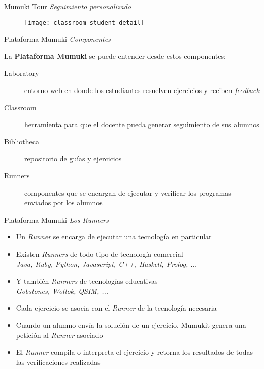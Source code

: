 \documentclass{beamer}
\begin{document}
\begin{frame}
    {Mumuki Tour}
    {\emph{Seguimiento personalizado}}

    \begin{figure}[h]
        \texttt{[image: classroom-student-detail]}
    \end{figure}
\end{frame}

\begin{frame}
    {Plataforma Mumuki}
    {\emph{Componentes}}

    La \textbf{Plataforma Mumuki} se puede entender desde estos componentes:

    \vspace{1.5em}

    \begin{description}
        \item[Laboratory] entorno web en donde los estudiantes resuelven ejercicios
        y reciben \emph{feedback}
        \item[Classroom] herramienta para que el docente pueda generar seguimiento de sus alumnos
        \item[Bibliotheca] repositorio de guías y ejercicios
        \item[Runners] componentes que se encargan de ejecutar y verificar los programas enviados por los alumnos
    \end{description}


\end{frame}


\begin{frame}
    {Plataforma Mumuki}
    {\emph{Los Runners}}

    \begin{itemize}
        \item Un \emph{Runner} se encarga de ejecutar una tecnología en particular
        \item Existen \emph{Runners} de todo tipo de tecnología comercial \\
        {\footnotesize\emph{Java, Ruby, Python, Javascript, C++, Haskell, Prolog, ...}}
        \item Y también \emph{Runners} de tecnologías educativas \\
        {\footnotesize\emph{Gobstones, Wollok, QSIM, ...}}
        \item Cada ejercicio se asocia con el \emph{Runner} de la tecnología necesaria
        \item Cuando un alumno envía la solución de un ejercicio, Mumukit
        genera una petición al \emph{Runner} asociado
        \item El \emph{Runner} compila o interpreta el ejercicio y retorna
        los resultados de todas las verificaciones realizadas
    \end{itemize}
\end{frame}
\end{document}
